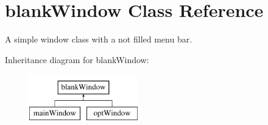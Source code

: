 \hypertarget{classgui_1_1window2_1_1blankWindow}{\section{blank\-Window \-Class \-Reference}
\label{classgui_1_1window2_1_1blankWindow}
}


\-A simple window class with a not filled menu bar.  


\-Inheritance diagram for blank\-Window\-:\begin{figure}[H]
\begin{center}
\leavevmode
\includegraphics[height=2.000000cm]{classgui_1_1window2_1_1blankWindow}
\end{center}
\end{figure}
